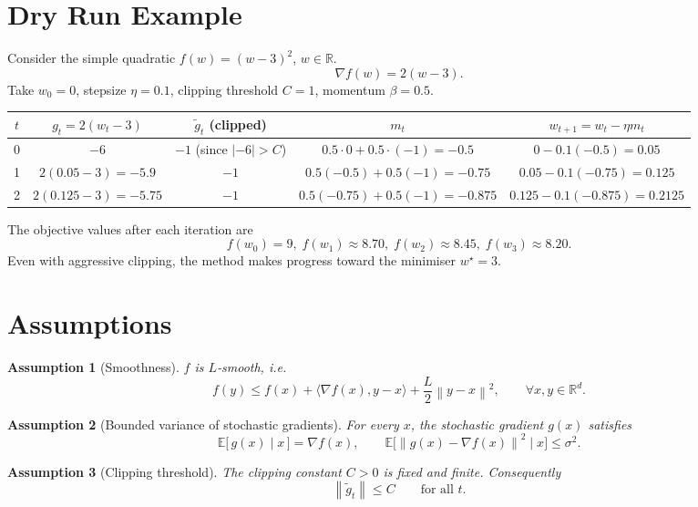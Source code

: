 \documentclass{article}
\newtheorem{assumption}{Assumption}
\newcommand{\EE}{\mathbb{E}}
\newcommand{\norm}[1]{\left\|#1\right\|}
\newcommand{\R}{\mathbb{R}}
\begin{document}
\section*{Dry Run Example}
Consider the simple quadratic $f(w)=(w-3)^{2}$, $w\in\R$.
\[
\nabla f(w)=2(w-3).
\]
Take $w_{0}=0$, stepsize $\eta=0.1$, clipping threshold $C=1$, momentum $\beta=0.5$.

\begin{center}
\begin{tabular}{c|c|c|c|c}
$t$ & $g_{t}=2(w_{t}-3)$ & $\tilde g_{t}$ (clipped) & $m_{t}$ & $w_{t+1}=w_{t}-\eta m_{t}$ \\ \hline
0 & $-6$ & $-1$ (since $|{-6}|>C$) & $0.5\cdot0+0.5\cdot(-1)=-0.5$ & $0-0.1(-0.5)=0.05$ \\[4pt]
1 & $2(0.05-3)=-5.9$ & $-1$ & $0.5(-0.5)+0.5(-1)=-0.75$ & $0.05-0.1(-0.75)=0.125$ \\[4pt]
2 & $2(0.125-3)=-5.75$ & $-1$ & $0.5(-0.75)+0.5(-1)=-0.875$ & $0.125-0.1(-0.875)=0.2125$ 
\end{tabular}
\end{center}
The objective values after each iteration are
\[
f(w_{0})=9,\; f(w_{1})\approx 8.70,\; f(w_{2})\approx 8.45,\; f(w_{3})\approx 8.20.
\]
Even with aggressive clipping, the method makes progress toward the minimiser $w^{\star}=3$.

\newpage

\section*{Assumptions}
\begin{assumption}[Smoothness]\label{ass:smooth}
$f$ is $L$‑smooth, i.e.
\[
f(y)\le f(x)+\langle\nabla f(x),y-x\rangle+\frac{L}{2}\norm{y-x}^{2},
\qquad\forall x,y\in\R^{d}.
\tag{A1}
\]
\end{assumption}

\begin{assumption}[Bounded variance of stochastic gradients]\label{ass:var}
For every $x$, the stochastic gradient $g(x)$ satisfies
\[
\EE\big[\,g(x)\mid x\,\big]=\nabla f(x),\qquad
\EE\big[\norm{g(x)-\nabla f(x)}^{2}\mid x\big]\le\sigma^{2}.
\tag{A2}
\]
\end{assumption}

\begin{assumption}[Clipping threshold]\label{ass:clip}
The clipping constant $C>0$ is fixed and finite. Consequently
\[
\norm{\tilde g_{t}}\le C\qquad\text{for all }t.
\tag{A3}
\]
\end{assumption}
\end{document}
